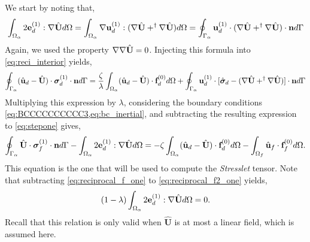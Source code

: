 We start by noting that, 
\begin{equation}
    \int_{\Omega_{\alpha}}  2\textbf{e}_d^{(1)} : \mathbf{\nabla} \hat{\textbf{U}}  d\Omega
    =\int_{\Omega_{\alpha}}  \mathbf{\nabla} \textbf{u}_d^{(1)} : (\mathbf{\nabla} \hat{\textbf{U}} +^\dagger \mathbf{\nabla} \hat{\textbf{U}})  d\Omega
    =
    \oint_{\Gamma_{\alpha}}   \textbf{u}_d^{(1)} \cdot (\mathbf{\nabla} \hat{\textbf{U}} + ^\dagger\mathbf{\nabla} \hat{\textbf{U}})  \cdot \textbf{n} d\Gamma
\end{equation}
Again, we used the property $\mathbf{\nabla}\mathbf{\nabla} \hat{\textbf{U}} = 0$. 
Injecting this formula into \ref{eq:reci_interior} yields,
\begin{equation*}
    \oint_{\Gamma_{\alpha}}  (\hat{\textbf{u}}_d - \hat{\textbf{U}})\cdot \bm\sigma_d^{(1)} \cdot \textbf{n} d\Gamma
    =
    \frac{\zeta}{\lambda} \int_{\Omega_{\alpha}} (\hat{\textbf{u}}_d - \hat{\textbf{U}}) \cdot \textbf{f}_d^{(0)} d\Omega
    + \oint_{\Gamma_{\alpha}} 
         \textbf{u}_d^{(1)}\cdot[\hat{\bm\sigma}_d  - (\mathbf{\nabla} \hat{\textbf{U}} + ^\dagger\mathbf{\nabla} \hat{\textbf{U}})]\cdot \textbf{n}
     d\Gamma
\end{equation*}
Multiplying this expression by $\lambda$, considering the boundary conditions \ref{eq:BCCCCCCCCCC3,eq:bc_inertial}, and subtracting the resulting expression to \ref{eq:stepone} gives,
\begin{equation}
    \intS{\hat{\textbf{U}}\cdot  \bm\sigma_f^{(1)} \cdot \textbf{n}}
    - \intO{
        2\textbf{e}_d^{(1)}:\grad \hat{\textbf{U}} 
   }
    = 
    - \zeta \intO{(\hat{\textbf{u}}_d - \hat{\textbf{U}}) \cdot \textbf{f}_d^{(0)}}
    - \intOf{\hat{\textbf{u}}_f\cdot  \textbf{f}^{(0)}_f}. 
    \label{eq:reciprocal_f2_one}
\end{equation}
This equation is the one that will be used to compute the \textit{Stresslet} tensor. 
Note that subtracting \ref{eq:reciprocal_f_one} to \ref{eq:reciprocal_f2_one} yields, 
\begin{equation}
    (1-\lambda)\intO{
        2\textbf{e}_d^{(1)}:\grad \hat{\textbf{U}} 
   }
    = 0. 
    \label{eq:shearrrrr}
\end{equation}
Recall that this relation is only valid when  $\hat{\textbf{U}}$ is at most a linear field, which is assumed here. 

